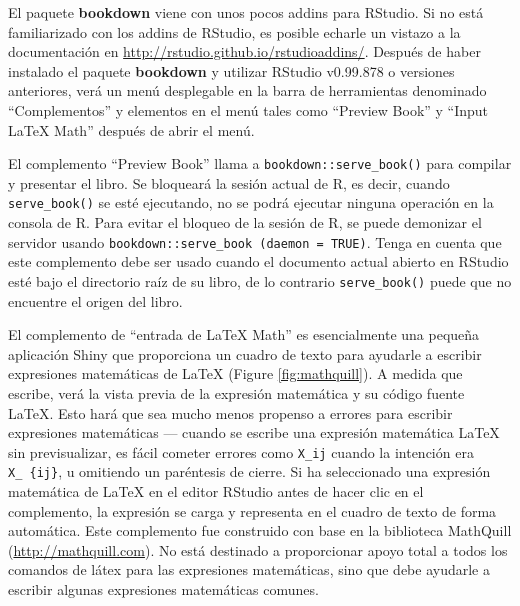 \documentclass[12pt,]{krantz}
\theoremstyle{definition}
\theoremstyle{definition}
\theoremstyle{remark}
\begin{document}
El paquete \textbf{bookdown} viene con unos pocos addins para RStudio.
Si no está familiarizado con los addins de RStudio, es posible echarle
un vistazo a la documentación en
\url{http://rstudio.github.io/rstudioaddins/}. Después de haber
instalado el paquete \textbf{bookdown} y utilizar RStudio v0.99.878 o
versiones anteriores, verá un menú desplegable en la barra de
herramientas denominado ``Complementos'' y elementos en el menú tales
como ``Preview Book'' y ``Input LaTeX Math'' después de abrir el menú.

El complemento ``Preview Book'' llama a \texttt{bookdown::serve\_book()}
para compilar y presentar el libro. Se bloqueará la sesión actual de R,
es decir, cuando \texttt{serve\_book()} se esté ejecutando, no se podrá
ejecutar ninguna operación en la consola de R. Para evitar el bloqueo de
la sesión de R, se puede demonizar el servidor usando
\texttt{bookdown::serve\_book\ (daemon\ =\ TRUE)}. Tenga en cuenta que
este complemento debe ser usado cuando el documento actual abierto en
RStudio esté bajo el directorio raíz de su libro, de lo contrario
\texttt{serve\_book()} puede que no encuentre el origen del libro.

El complemento de ``entrada de LaTeX Math'' es esencialmente una pequeña
aplicación Shiny que proporciona un cuadro de texto para ayudarle a
escribir expresiones matemáticas de LaTeX (Figure \ref{fig:mathquill}).
A medida que escribe, verá la vista previa de la expresión matemática y
su código fuente LaTeX. Esto hará que sea mucho menos propenso a errores
para escribir expresiones matemáticas --- cuando se escribe una
expresión matemática LaTeX sin previsualizar, es fácil cometer errores
como \texttt{X\_ij} cuando la intención era \texttt{X\_\ \{ij\}}, u
omitiendo un paréntesis de cierre. Si ha seleccionado una expresión
matemática de LaTeX en el editor RStudio antes de hacer clic en el
complemento, la expresión se carga y representa en el cuadro de texto de
forma automática. Este complemento fue construido con base en la
biblioteca MathQuill (\url{http://mathquill.com}). No está destinado a
proporcionar apoyo total a todos los comandos de látex para las
expresiones matemáticas, sino que debe ayudarle a escribir algunas
expresiones matemáticas comunes.
\end{document}
